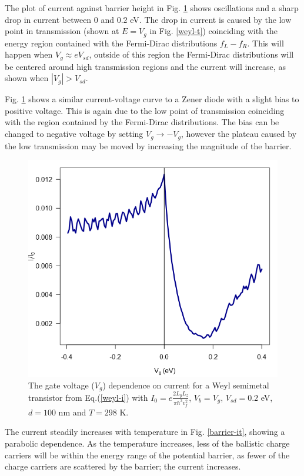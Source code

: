 \documentclass[prb,twocolumn,aps,superscriptaddress,showpacs,floatfix]{revtex4}
\begin{document}
	The plot of current against barrier height in Fig. \ref{barrier-ivg} shows oscillations and a sharp drop in current between $0$ and $0.2$ eV. The drop in current is caused by the low point in transmission (shown at $E=V_{g}$ in Fig. \ref{weyl-t}) coinciding with the energy region contained with the Fermi-Dirac distributions $f_{L}-f_{R}$. This will happen when $V_{g}\approx eV_{sd}$, outside of this region the Fermi-Dirac distributions will be centered around high transmission regions and the current will increase, as shown when $|V_{g}|>V_{sd}$.

	Fig. \ref{barrier-ivg} shows a similar current-voltage curve to a Zener diode with a slight bias to positive voltage. This is again due to the low point of transmission coinciding with the region contained by the Fermi-Dirac distributions. The bias can be changed to negative voltage by setting $V_{g}\rightarrow -V_{g}$, however the plateau caused by the low transmission may be moved by increasing the magnitude of the barrier.

\begin{figure}
	\centerline{\includegraphics[scale=0.4]{barrier-ivg}}
	\caption{The gate voltage ($V_{g}$) dependence on current for a Weyl semimetal transistor from Eq.(\ref{weyl-i}) with $I_{0}=e\frac{2L_{y}L_{z}}{\pi\hbar^{3}v_{f}^{2}}$, $V_{b}=V_{g}$, $V_{sd}=0.2$ eV, $d=100$ nm and $T=298$ K.}
	\label{barrier-ivg}
\end{figure}

	The current steadily increases with temperature in Fig. \ref{barrier-it}, showing a parabolic dependence. As the temperature increases, less of the ballistic charge carriers will be within the energy range of the potential barrier, as fewer of the charge carriers are scattered by the barrier; the current increases.
\end{document}

